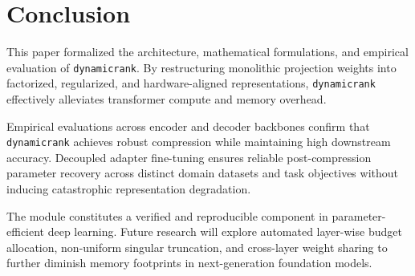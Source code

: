 \section{Conclusion}
This paper formalized the architecture, mathematical formulations, and empirical evaluation of \texttt{dynamicrank}. By restructuring monolithic projection weights into factorized, regularized, and hardware-aligned representations, \texttt{dynamicrank} effectively alleviates transformer compute and memory overhead.

Empirical evaluations across encoder and decoder backbones confirm that \texttt{dynamicrank} achieves robust compression while maintaining high downstream accuracy. Decoupled adapter fine-tuning ensures reliable post-compression parameter recovery across distinct domain datasets and task objectives without inducing catastrophic representation degradation.

The module constitutes a verified and reproducible component in parameter-efficient deep learning. Future research will explore automated layer-wise budget allocation, non-uniform singular truncation, and cross-layer weight sharing to further diminish memory footprints in next-generation foundation models.

